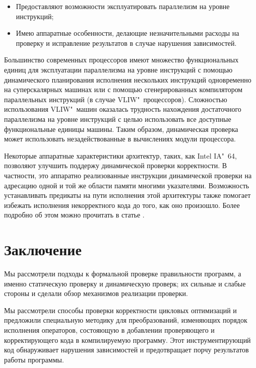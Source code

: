 \begin{itemize}
	\item Предоставляют возможности эксплуатировать параллелизм на уровне инструкций;
	\item Имею аппаратные особенности, делающие незначительными расходы на проверку и исправление результатов в случае нарушения зависимостей.
\end{itemize}

Большинство современных процессоров имеют множество функциональных единиц для эксплуатации параллелизма на уровне инструкций с помощью динамического планирования исполнения нескольких инструкций одновременно на суперскалярных машинах или с помощью сгенерированных компилятором параллельных инструкций (в случае VLIW"~процессоров). Сложностью использования VLIW"~машин оказалась трудность нахождения достаточного параллелизма на уровне инструкций с целью использовать все доступные функциональные единицы машины. Таким образом, динамическая проверка может использовать незадействованные в вычислениях модули процессора.

Некоторые аппаратные характеристики архитектур, таких, как Intel IA"~64, позволяют улучшить поддержу динамической проверки корректности. В частности, это аппаратно реализованные инструкции динамической проверки на адресацию одной и той же области памяти многими указателями. Возможность устанавливать предикаты на пути исполнения этой архитектуры также помогает избежать исполнения некорректного кода до того, как оно произошло. Более подробно об этом можно прочитать в статье \cite{GHCP02}.

\section*{Заключение}
%

Мы рассмотрели подходы к формальной проверке правильности программ, а именно статическую проверку и динамическую проверк; их сильные и слабые стороны и сделали обзор механизмов реализации проверки.

Мы рассмотрели способы проверки корректности цикловых оптимизаций и предложили специальную методику для преобразований, изменяющих порядок исполнения операторов, состояющую в добавлении проверяющего и корректирующего кода в компилируемую программу. Этот инструментирующий код обнаруживает нарушения зависимостей и предотвращает порчу результатов работы программы.